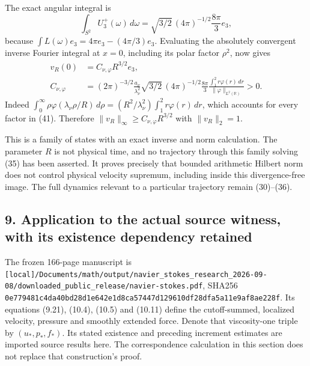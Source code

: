 The exact angular integral is \[
\int_{S^2}U_3^+(\omega)\,d\omega
=\sqrt{3/2}\,(4\pi)^{-1/2}\frac{8\pi}{3}e_3,
\tag{40}
\] because \(\int L(\omega)e_3=4\pi e_3-(4\pi/3)e_3\). Evaluating the absolutely convergent inverse Fourier integral at \(x=0\), including its polar factor \(\rho^2\), now gives \[
\begin{aligned}
v_R(0)&=C_{\nu,\varphi}R^{3/2}e_3,\\
C_{\nu,\varphi}
&=(2\pi)^{-3/2}\frac{a_\nu}{\lambda_\nu^2}
\sqrt{3/2}\,(4\pi)^{-1/2}\frac{8\pi}{3}
\frac{\int_1^2r\varphi(r)\,dr}{\|\varphi\|_{L^2(\mathbb R)}}>0.
\end{aligned}
\tag{41}
\] Indeed \(\int_0^\infty\rho\varphi(\lambda_\nu\rho/R)\,d\rho
=(R^2/\lambda_\nu^2)\int_1^2r\varphi(r)\,dr\), which accounts for every factor in (41). Therefore \(\|v_R\|_\infty\ge C_{\nu,\varphi}R^{3/2}\) with \(\|v_R\|_2=1\).

This is a family of states with an exact inverse and norm calculation. The parameter \(R\) is not physical time, and no trajectory through this family solving (35) has been asserted. It proves precisely that bounded arithmetic Hilbert norm does not control physical velocity supremum, including inside this divergence-free image. The full dynamics relevant to a particular trajectory remain (30)--(36).

\subsection{9. Application to the actual source witness, with its existence dependency retained}\label{application-to-the-actual-source-witness-with-its-existence-dependency-retained}

The frozen 166-page manuscript is \texttt{[local]/Documents/math/output/navier\_stokes\_research\_2026-09-08/downloaded\_public\_release/navier-stokes.pdf}, SHA256 \texttt{0e779481c4da40bd28d1e642e1d8ca57447d129610df28dfa5a11e9af8ae228f}. Its equations (9.21), (10.4), (10.5) and (10.11) define the cutoff-summed, localized velocity, pressure and smoothly extended force. Denote that viscosity-one triple by \((u_*,p_*,f_*)\). Its stated existence and preceding increment estimates are imported source results here. The correspondence calculation in this section does not replace that construction's proof.

